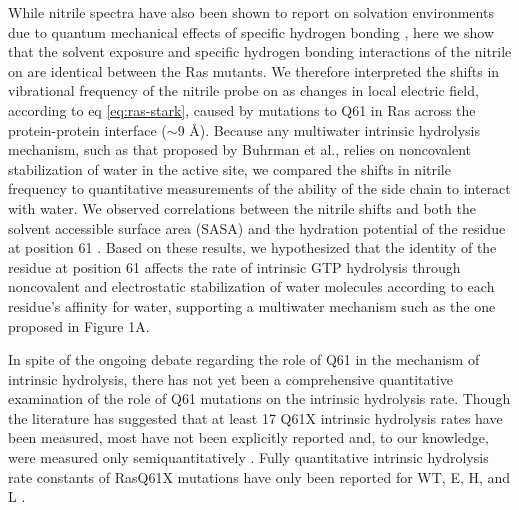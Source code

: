 While nitrile spectra have also been shown to report on solvation environments due to quantum mechanical effects of specific hydrogen bonding \cite{Waegele2009, Oh2008,Fafarman2010}, here we show that the solvent exposure and specific hydrogen bonding interactions of the nitrile on \RalBSCN{} are identical between the Ras mutants. 
We therefore interpreted the shifts in vibrational frequency of the nitrile probe on \RalB{} as changes in local electric field, according to eq \ref{eq:ras-stark}, caused by mutations to Q61 in Ras across the protein-protein interface ($\sim$9 \si{\angstrom}). 
Because any multiwater intrinsic hydrolysis mechanism, such as that proposed by Buhrman et al., relies on noncovalent stabilization of water in the active site, we compared the shifts in nitrile frequency to quantitative measurements of the ability of the side chain to interact with water. 
We observed correlations between the nitrile shifts and both the solvent accessible surface area (SASA) and the hydration potential of the residue at position 61 \cite{Stafford2012}.
Based on these results, we hypothesized that the identity of the residue at position 61 affects the rate of intrinsic GTP hydrolysis through noncovalent and electrostatic stabilization of water molecules according to each residue's affinity for water, supporting a multiwater mechanism such as the one proposed in Figure 1A.

In spite of the ongoing debate regarding the role of Q61 in the mechanism of intrinsic hydrolysis, there has not yet been a comprehensive quantitative examination of the role of Q61 mutations on the intrinsic hydrolysis rate. 
Though the literature has suggested that at least 17 Q61X intrinsic hydrolysis rates have been measured, most have not been explicitly reported and, to our knowledge, were measured only semiquantitatively \cite{Der1986}.
Fully quantitative intrinsic hydrolysis rate constants of RasQ61X mutations have only been reported for WT, E, H, and L \cite{Krengel1990, Frech1994}.

